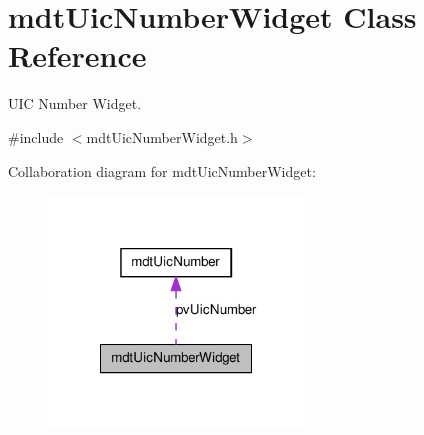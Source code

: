 \hypertarget{classmdt_uic_number_widget}{
\section{mdtUicNumberWidget Class Reference}
\label{classmdt_uic_number_widget}
}


UIC Number Widget.  




{\ttfamily \#include $<$mdtUicNumberWidget.h$>$}



Collaboration diagram for mdtUicNumberWidget:
\nopagebreak
\begin{figure}[H]
\begin{center}
\leavevmode
\includegraphics[width=197pt]{classmdt_uic_number_widget__coll__graph}
\end{center}
\end{figure}
